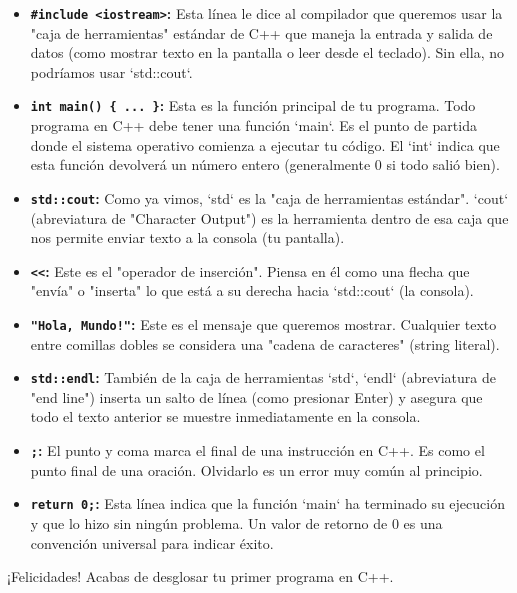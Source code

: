 \begin{itemize}
    \item \textbf{\texttt{\#include <iostream>}:} Esta línea le dice al compilador que queremos usar la "caja de herramientas" estándar de C++ que maneja la entrada y salida de datos (como mostrar texto en la pantalla o leer desde el teclado). Sin ella, no podríamos usar `std::cout`.
    \item \textbf{\texttt{int main() \{ ... \}}:} Esta es la función principal de tu programa. Todo programa en C++ debe tener una función `main`. Es el punto de partida donde el sistema operativo comienza a ejecutar tu código. El `int` indica que esta función devolverá un número entero (generalmente 0 si todo salió bien).
    \item \textbf{\texttt{std::cout}:} Como ya vimos, `std` es la "caja de herramientas estándar". `cout` (abreviatura de "Character Output") es la herramienta dentro de esa caja que nos permite enviar texto a la consola (tu pantalla).
    \item \textbf{\texttt{\string<\string<}:} Este es el "operador de inserción". Piensa en él como una flecha que "envía" o "inserta" lo que está a su derecha hacia `std::cout` (la consola).
    \item \textbf{\texttt{"Hola, Mundo!"}:} Este es el mensaje que queremos mostrar. Cualquier texto entre comillas dobles se considera una "cadena de caracteres" (string literal).
    \item \textbf{\texttt{std::endl}:} También de la caja de herramientas `std`, `endl` (abreviatura de "end line") inserta un salto de línea (como presionar Enter) y asegura que todo el texto anterior se muestre inmediatamente en la consola.
    \item \textbf{\texttt{;}:} El punto y coma marca el final de una instrucción en C++. Es como el punto final de una oración. Olvidarlo es un error muy común al principio.
    \item \textbf{\texttt{return 0;}:} Esta línea indica que la función `main` ha terminado su ejecución y que lo hizo sin ningún problema. Un valor de retorno de 0 es una convención universal para indicar éxito.
\end{itemize}

¡Felicidades! Acabas de desglosar tu primer programa en C++.
